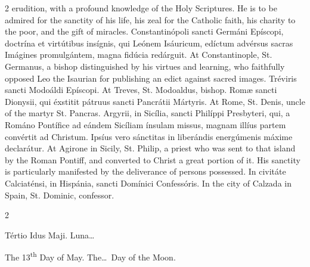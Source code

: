\begin{paracol}{2}
 erudition, with a profound knowledge of the Holy Scriptures. He is to 
 be admired for the sanctity of his life, his zeal for the Catholic faith, 
 his charity to the poor, and the gift of miracles.
\switchcolumn*
{}
Constantinópoli sancti Germáni Epíscopi, doctrína et 
 virtútibus insígnis, qui Leónem Isáuricum, edíctum advérsus sacras Imágines 
 promulgántem, magna fidúcia redárguit.
\switchcolumn
{}
At Constantinople, St. Germanus, a bishop distinguished 
 by his virtues and learning, who faithfully opposed Leo the Isaurian for 
 publishing an edict against sacred images.
\switchcolumn*
{}
Tréviris sancti Modoáldi Epíscopi.
\switchcolumn
{}
At Treves, St. Modoaldus, bishop.
\switchcolumn*
{}
Romæ sancti Dionysii, qui éxstitit pátruus sancti 
 Pancrátii Mártyris.
\switchcolumn
{}
At Rome, St. Denis, uncle of the martyr St. Pancras.
\switchcolumn*
{}
Argyrii, in Sicília, sancti Philíppi Presbyteri, qui, a 
 Románo Pontífice ad eándem Sicíliam ínsulam missus, magnam illíus partem 
 convértit ad Christum. Ipsíus vero sánctitas in liberándis energúmenis 
 máxime declarátur.
\switchcolumn
{}
At Agirone in Sicily, St. Philip, a priest who was sent 
 to that island by the Roman Pontiff, and converted to Christ a great portion 
 of it. His sanctity is particularly manifested by the deliverance of 
 persons possessed.
\switchcolumn*
{}
In civitáte 
 Calciaténsi, in Hispánia, sancti Domínici Confessóris.
\switchcolumn
{}
In the city of Calzada in Spain, 
 St. Dominic, confessor.
\switchcolumn*
{}
\end{paracol}


\begin{paracol}{2}
\begin{center}{\color{gregoriocolor} Tértio Idus Maji. 
 Luna\dots\ }\end{center}
\switchcolumn
{}
\begin{center}{\color{gregoriocolor} The 
 13\textsuperscript{th} Day of May. The\dots\ Day of the Moon.}\end{center}
\end{paracol}

